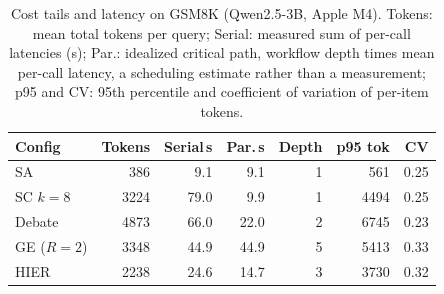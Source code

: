 \begin{table}[t]\centering\small
\caption{Cost tails and latency on GSM8K (Qwen2.5-3B, Apple M4). Tokens: mean
total tokens per query; Serial: measured sum of per-call latencies (s); Par.:
idealized critical path, workflow depth times mean per-call latency, a scheduling
estimate rather than a measurement; p95 and CV: 95th percentile and coefficient of
variation of per-item tokens.}
\label{tab:latency}
\setlength{\tabcolsep}{4pt}
\begin{tabular}{lrrrrrr}
\toprule
Config & Tokens & Serial\,s & Par.\,s & Depth & p95 tok & CV \\
\midrule
SA           & 386  & 9.1  & 9.1  & 1 & 561  & 0.25 \\
SC $k{=}8$   & 3224 & 79.0 & 9.9  & 1 & 4494 & 0.25 \\
Debate       & 4873 & 66.0 & 22.0 & 2 & 6745 & 0.23 \\
GE ($R{=}2$) & 3348 & 44.9 & 44.9 & 5 & 5413 & 0.33 \\
HIER         & 2238 & 24.6 & 14.7 & 3 & 3730 & 0.32 \\
\bottomrule
\end{tabular}
\end{table}
